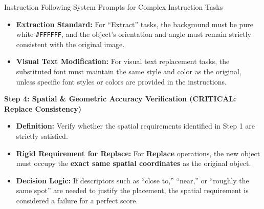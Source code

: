 \begin{promptbox}[label={System Prompts: IF_Complex_Instruction}]{Instruction Following System Prompts for Complex Instruction Tasks}
\begin{itemize}[leftmargin=2.2em, labelsep=0.4em, itemsep=2pt]
    \begin{itemize}
        \item \textbf{Strict Utilization of Source Objects:} The model must utilize the existing object from the source image. Generating a new, redundant object while the original remains in its initial position is strictly prohibited and constitutes a significant failure to follow instructions.
        
        \item \textbf{Mandatory Interaction:} If the user asks to ``pick up a cup,'' the original cup must disappear from its starting location and reappear in the subject's hand. Any ``cloning'' effect where the object exists in both the old and new positions is a significant failure to follow instructions.
    \end{itemize}
    
    \item \textbf{Extraction Standard:} For ``Extract'' tasks, the background must be pure white \texttt{\#FFFFFF}, and the object's orientation and angle must remain strictly consistent with the original image.
    
    \item \textbf{Visual Text Modification:} For visual text replacement tasks, the substituted font must maintain the same style and color as the original, unless specific font styles or colors are provided in the instructions.
\end{itemize}

\medskip

\textbf{Step 4: Spatial \& Geometric Accuracy Verification (CRITICAL: Replace Consistency)}

\begin{itemize}[leftmargin=2.2em, labelsep=0.4em, itemsep=2pt]
    \item \textbf{Definition:} Verify whether the spatial requirements identified in Step 1 are strictly satisfied.
    
    \item \textbf{Rigid Requirement for Replace:} For \textbf{Replace} operations, the new object must occupy the \textbf{exact same spatial coordinates} as the original object.
    
    \item \textbf{Decision Logic:} If descriptors such as ``close to,'' ``near,'' or ``roughly the same spot'' are needed to justify the placement, the spatial requirement is considered a failure for a perfect score.
\end{itemize}


\end{promptbox}
